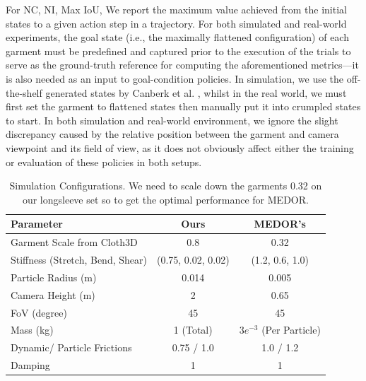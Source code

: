 \documentclass[journal]{IEEEtran}
\newcommand{\addinfo}[1]{\textcolor{myPurple}{#1}}
\begin{document}
\addinfo{For NC, NI, Max IoU, We report the maximum value achieved from the initial states to a given action step in a trajectory. For both simulated and real-world experiments, the goal state (i.e., the maximally flattened configuration) of each garment must be predefined and captured prior to the execution of the trials to serve as the ground-truth reference for computing the aforementioned metrics---it is also needed as an input to goal-condition policies. In simulation, we use the off-the-shelf generated states by Canberk et al. \cite{canberk2023cloth}, whilst in the real world, we must first set the garment to flattened states then manually put it into crumpled states to start. In both simulation and real-world environment, we ignore the slight discrepancy caused by the relative position between the garment and camera viewpoint and its field of view, as it does not obviously affect either the training or evaluation of these policies in both setups.}
\begin{table}[!t]
\centering
\caption{\addinfo{Simulation Configurations. We need to scale down the garments 0.32 on our longsleeve set so to get the optimal performance for MEDOR.}}
\label{tab:sim-config}
\begin{tabular}{@{}lcc@{}}
\toprule
\textbf{Parameter} & \textbf{Ours} & \textbf{MEDOR's} \\ \midrule
Garment Scale from Cloth3D & 0.8 & 0.32\\
Stiffness (Stretch, Bend, Shear) & (0.75, 0.02, 0.02) & (1.2, 0.6, 1.0) \\
Particle Radius (m) & 0.014 & 0.005 \\
Camera Height (m) & 2 & 0.65\\
FoV (degree) & 45 & 45\\
Mass (kg) & 1 (Total) & $3e^{-3}$ (Per Particle) \\
Dynamic/ Particle Frictions & 0.75 / 1.0&  1.0 / 1.2\\
Damping & 1 & 1 \\
\bottomrule
\end{tabular}
\end{table}
\end{document}
